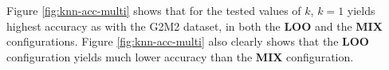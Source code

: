 Figure \ref{fig:knn-acc-multi} shows that for the tested values of \(k\),
\(k=1\) yields highest accuracy as with the G2M2 dataset,
in both the \textbf{LOO} and the \textbf{MIX} configurations.
Figure \ref{fig:knn-acc-multi} also clearly shows that the \textbf{LOO} configuration
yields much lower accuracy than the \textbf{MIX} configuration.